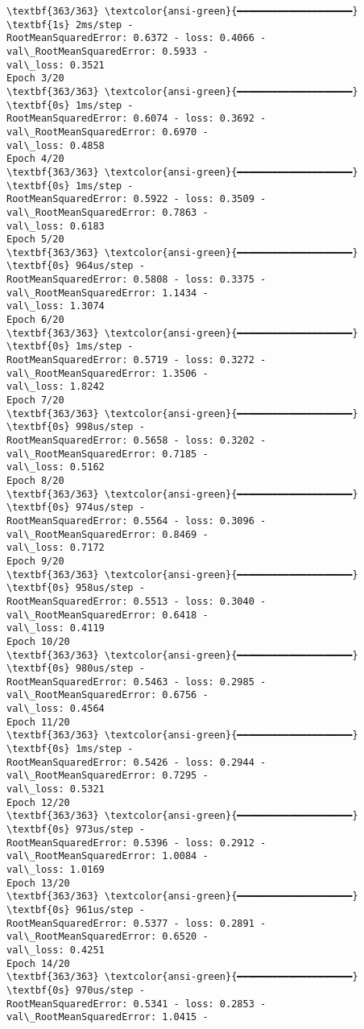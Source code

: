 \documentclass[12pt letter]{report}
\begin{document}
    \begin{Verbatim}[commandchars=\\\{\}]
\textbf{363/363} \textcolor{ansi-green}{━━━━━━━━━━━━━━━━━━━━} \textbf{1s} 2ms/step -
RootMeanSquaredError: 0.6372 - loss: 0.4066 - val\_RootMeanSquaredError: 0.5933 -
val\_loss: 0.3521
Epoch 3/20
\textbf{363/363} \textcolor{ansi-green}{━━━━━━━━━━━━━━━━━━━━} \textbf{0s} 1ms/step -
RootMeanSquaredError: 0.6074 - loss: 0.3692 - val\_RootMeanSquaredError: 0.6970 -
val\_loss: 0.4858
Epoch 4/20
\textbf{363/363} \textcolor{ansi-green}{━━━━━━━━━━━━━━━━━━━━} \textbf{0s} 1ms/step -
RootMeanSquaredError: 0.5922 - loss: 0.3509 - val\_RootMeanSquaredError: 0.7863 -
val\_loss: 0.6183
Epoch 5/20
\textbf{363/363} \textcolor{ansi-green}{━━━━━━━━━━━━━━━━━━━━} \textbf{0s} 964us/step -
RootMeanSquaredError: 0.5808 - loss: 0.3375 - val\_RootMeanSquaredError: 1.1434 -
val\_loss: 1.3074
Epoch 6/20
\textbf{363/363} \textcolor{ansi-green}{━━━━━━━━━━━━━━━━━━━━} \textbf{0s} 1ms/step -
RootMeanSquaredError: 0.5719 - loss: 0.3272 - val\_RootMeanSquaredError: 1.3506 -
val\_loss: 1.8242
Epoch 7/20
\textbf{363/363} \textcolor{ansi-green}{━━━━━━━━━━━━━━━━━━━━} \textbf{0s} 998us/step -
RootMeanSquaredError: 0.5658 - loss: 0.3202 - val\_RootMeanSquaredError: 0.7185 -
val\_loss: 0.5162
Epoch 8/20
\textbf{363/363} \textcolor{ansi-green}{━━━━━━━━━━━━━━━━━━━━} \textbf{0s} 974us/step -
RootMeanSquaredError: 0.5564 - loss: 0.3096 - val\_RootMeanSquaredError: 0.8469 -
val\_loss: 0.7172
Epoch 9/20
\textbf{363/363} \textcolor{ansi-green}{━━━━━━━━━━━━━━━━━━━━} \textbf{0s} 958us/step -
RootMeanSquaredError: 0.5513 - loss: 0.3040 - val\_RootMeanSquaredError: 0.6418 -
val\_loss: 0.4119
Epoch 10/20
\textbf{363/363} \textcolor{ansi-green}{━━━━━━━━━━━━━━━━━━━━} \textbf{0s} 980us/step -
RootMeanSquaredError: 0.5463 - loss: 0.2985 - val\_RootMeanSquaredError: 0.6756 -
val\_loss: 0.4564
Epoch 11/20
\textbf{363/363} \textcolor{ansi-green}{━━━━━━━━━━━━━━━━━━━━} \textbf{0s} 1ms/step -
RootMeanSquaredError: 0.5426 - loss: 0.2944 - val\_RootMeanSquaredError: 0.7295 -
val\_loss: 0.5321
Epoch 12/20
\textbf{363/363} \textcolor{ansi-green}{━━━━━━━━━━━━━━━━━━━━} \textbf{0s} 973us/step -
RootMeanSquaredError: 0.5396 - loss: 0.2912 - val\_RootMeanSquaredError: 1.0084 -
val\_loss: 1.0169
Epoch 13/20
\textbf{363/363} \textcolor{ansi-green}{━━━━━━━━━━━━━━━━━━━━} \textbf{0s} 961us/step -
RootMeanSquaredError: 0.5377 - loss: 0.2891 - val\_RootMeanSquaredError: 0.6520 -
val\_loss: 0.4251
Epoch 14/20
\textbf{363/363} \textcolor{ansi-green}{━━━━━━━━━━━━━━━━━━━━} \textbf{0s} 970us/step -
RootMeanSquaredError: 0.5341 - loss: 0.2853 - val\_RootMeanSquaredError: 1.0415 -

\end{Verbatim}
\end{document}
